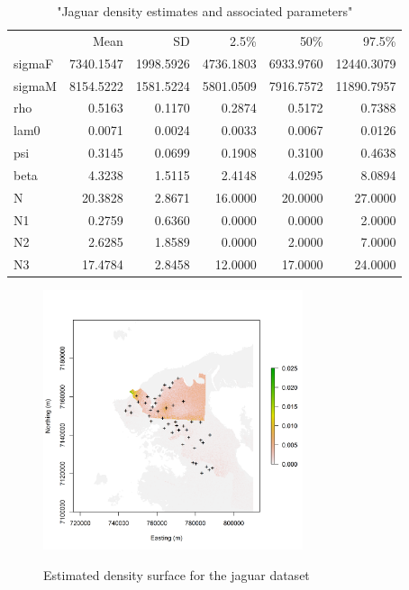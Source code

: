 \begin{table}
\caption{"Jaguar density estimates and associated parameters"}
\begin{tabular}{lrrrrr}
\hline
& Mean & SD & 2.5\% & 50\% & 97.5\% \\
 sigmaF &  7340.1547 &  1998.5926 &  4736.1803 &  6933.9760 & 12440.3079 \\
 sigmaM &  8154.5222 &  1581.5224 &  5801.0509 &  7916.7572 & 11890.7957 \\
 rho &     0.5163 &     0.1170 &     0.2874 &     0.5172 &     0.7388 \\
 lam0 &     0.0071 &     0.0024 &     0.0033 &     0.0067 &     0.0126 \\
 psi &     0.3145 &     0.0699 &     0.1908 &     0.3100 &     0.4638 \\
 beta &     4.3238 &     1.5115 &     2.4148 &     4.0295 &     8.0894 \\
 N &    20.3828 &     2.8671 &    16.0000 &    20.0000 &    27.0000 \\
 N1 &     0.2759 &     0.6360 &     0.0000 &     0.0000 &     2.0000 \\
 N2 &     2.6285 &     1.8589 &     0.0000 &     2.0000 &     7.0000 \\
 N3 &    17.4784 &     2.8458 &    12.0000 &    17.0000 &    24.0000 \\

\hline
\end{tabular}
\end{table}



\begin{figure}
\centering
\includegraphics[width=3in,height=3in]{Ch11/figs/Dsurface34}
\label{ch9:fig:Dsurface}
\caption{Estimated density surface for the jaguar dataset}
\end{figure}

